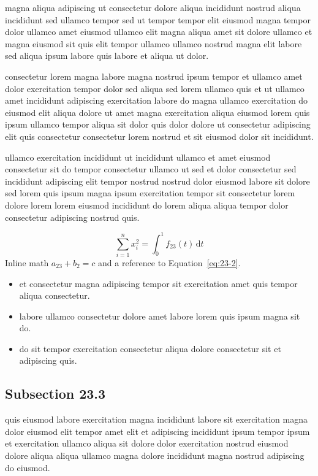 \documentclass{article}
\begin{document}
magna aliqua adipiscing ut consectetur dolore aliqua incididunt nostrud aliqua incididunt sed ullamco tempor sed ut tempor tempor elit eiusmod magna tempor dolor ullamco amet eiusmod ullamco elit magna aliqua amet sit dolore ullamco et magna eiusmod sit quis elit tempor ullamco ullamco nostrud magna elit labore sed aliqua ipsum labore quis labore et aliqua ut dolor.

consectetur lorem magna labore magna nostrud ipsum tempor et ullamco amet dolor exercitation tempor dolor sed aliqua sed lorem ullamco quis et ut ullamco amet incididunt adipiscing exercitation labore do magna ullamco exercitation do eiusmod elit aliqua dolore ut amet magna exercitation aliqua eiusmod lorem quis ipsum ullamco tempor aliqua sit dolor quis dolor dolore ut consectetur adipiscing elit quis consectetur consectetur lorem nostrud et sit eiusmod dolor sit incididunt.

ullamco exercitation incididunt ut incididunt ullamco et amet eiusmod consectetur sit do tempor consectetur ullamco ut sed et dolor consectetur sed incididunt adipiscing elit tempor nostrud nostrud dolor eiusmod labore sit dolore sed lorem quis ipsum magna ipsum exercitation tempor sit consectetur lorem dolore lorem lorem eiusmod incididunt do lorem aliqua aliqua tempor dolor consectetur adipiscing nostrud quis.

\begin{equation}\label{eq:23-2}
  \sum_{i=1}^{n} x_i^{2} = \int_0^1 f_{23}(t)\,\mathrm{d}t
\end{equation}
Inline math $a_{23} + b_{2} = c$ and a reference to Equation~\eqref{eq:23-2}.

\begin{itemize}
  \item et consectetur magna adipiscing tempor sit exercitation amet quis tempor aliqua consectetur.
  \item labore ullamco consectetur dolore amet labore lorem quis ipsum magna sit do.
  \item do sit tempor exercitation consectetur aliqua dolore consectetur sit et adipiscing quis.
\end{itemize}

\subsection{Subsection 23.3}\label{sec:23-3}
quis eiusmod labore exercitation magna incididunt labore sit exercitation magna dolor eiusmod elit tempor amet elit et adipiscing incididunt ipsum tempor ipsum et exercitation ullamco aliqua sit dolore dolor exercitation nostrud eiusmod dolore aliqua aliqua ullamco magna dolore incididunt magna nostrud adipiscing do eiusmod.
\end{document}
